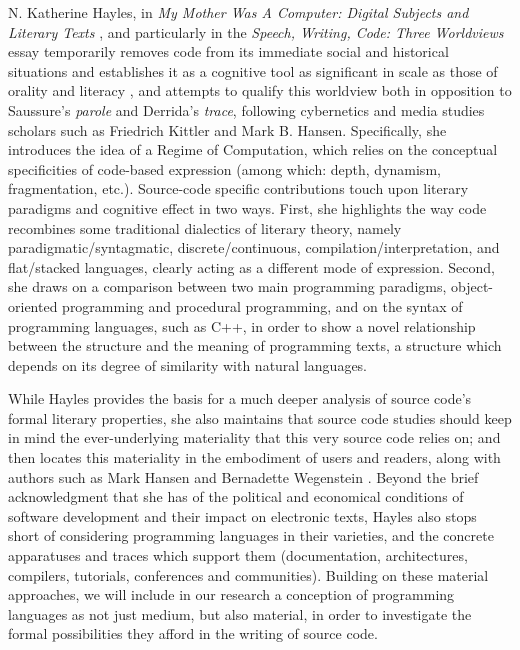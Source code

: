 N. Katherine Hayles, in \emph{My Mother Was A Computer: Digital Subjects and Literary Texts} \citep{hayles_my_2010}, and particularly in the \emph{Speech, Writing, Code: Three Worldviews} essay temporarily removes code from its immediate social and historical situations and establishes it as a cognitive tool as significant in scale as those of orality and literacy \citep{ong_orality_2012}, and attempts to qualify this worldview both in opposition to Saussure's \emph{parole} and Derrida's \emph{trace}, following cybernetics and media studies scholars such as Friedrich Kittler and Mark B. Hansen. Specifically, she introduces the idea of a Regime of Computation, which relies on the conceptual specificities of code-based expression (among which: depth, dynamism, fragmentation, etc.). Source-code specific contributions touch upon literary paradigms and cognitive effect in two ways. First, she highlights the way code recombines some traditional dialectics of literary theory, namely paradigmatic/syntagmatic, discrete/continuous, compilation/interpretation, and flat/stacked languages, clearly acting as a different mode of expression. Second, she draws on a comparison between two main programming paradigms, object-oriented programming and procedural programming, and on the syntax of programming languages, such as C++, in order to show a novel relationship between the structure and the meaning of programming texts, a structure which depends on its degree of similarity with natural languages.

While Hayles provides the basis for a much deeper analysis of source code's formal literary properties, she also maintains that source code studies should keep in mind the ever-underlying materiality that this very source code relies on; and then locates this materiality in the embodiment of users and readers, along with authors such as Mark Hansen \citep{hansen_bodies_2006} and Bernadette Wegenstein \citep{wegenstein_bodies_2010}. Beyond the brief acknowledgment that she has of the political and economical conditions of software development and their impact on electronic texts, Hayles also stops short of considering programming languages in their varieties, and the concrete apparatuses and traces which support them (documentation, architectures, compilers, tutorials, conferences and communities). Building on these material approaches, we will include in our research a conception of programming languages as not just medium, but also material, in order to investigate the formal possibilities they afford in the writing of source code.

